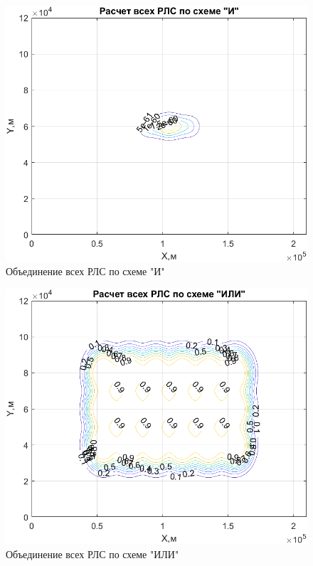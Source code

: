 \begin{figure}
    \centering
    \includegraphics{figures/AND_RLS_18.png}
    \caption{Объединение всех РЛС по схеме "И"}
    \label{fig:my_label}
\end{figure}

\begin{figure}
    \centering
    \includegraphics{figures/OR_RLS_18.png}
    \caption{Объединение всех РЛС по схеме "ИЛИ"}
    \label{fig:my_label}
\end{figure}

